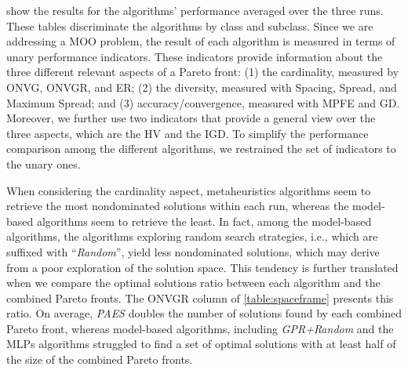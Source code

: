 show the results for the algorithms' performance averaged over the three runs. These tables discriminate the algorithms by class and subclass. Since we are addressing a \ac{MOO} problem, the result of each algorithm is measured in terms of unary performance indicators. These indicators provide information about the three different relevant aspects of a Pareto front: (1) the cardinality, measured by \ac{ONVG}, \ac{ONVGR}, and \ac{ER}; (2) the diversity, measured with Spacing, Spread, and Maximum Spread; and (3) accuracy/convergence, measured with \ac{MPFE} and \ac{GD}. Moreover, we further use two indicators that provide a general view over the three aspects, which are the \ac{HV} and the \ac{IGD}. To simplify the performance comparison among the different algorithms, we restrained the set of indicators to the unary ones. 

When considering the cardinality aspect, metaheuristics algorithms seem to retrieve the most nondominated solutions within each run, whereas the model-based algorithms seem to retrieve the least. In fact, among the model-based algorithms, the algorithms exploring random search strategies, i.e., which are suffixed with ``\textit{Random}'', yield less nondominated solutions, which may derive from a poor exploration of the solution space. This tendency is further translated when we compare the optimal solutions ratio between each algorithm and the combined Pareto fronts. The \ac{ONVGR} column of \cref{table:spaceframe} presents this ratio. On average, \textit{PAES} doubles the number of solutions found by each combined Pareto front, whereas model-based algorithms, including \textit{GPR+Random} and the \acp{MLP} algorithms struggled to find a set of optimal solutions with at least half of the size of the combined Pareto fronts. 

